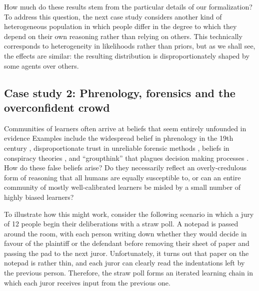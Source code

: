 \documentclass[doc]{apa6}
\begin{document}
How much do these results stem from the particular details of our formalization? To address this question, the next case study considers another kind of heterogeneous population in which people differ in the degree to which they depend on their own reasoning rather than relying on others. This technically corresponds to heterogeneity in likelihoods rather than priors, but as we shall see, the effects are similar: the resulting distribution is disproportionately shaped by some agents over others.

\subsection{Case study 2: Phrenology, forensics and the overconfident crowd}

Communities of learners often arrive at beliefs that seem entirely unfounded in evidence Examples include the widespread belief in phrenology in the 19th century \parencite{faigman2007anecdotal}, disproportionate trust in unreliable forensic methods \parencite{pcast2016}, beliefs in conspiracy theories \parencite{goertzel1994belief}, and ``groupthink'' that plagues decision making processes \parencite{janis1982groupthink}. How do these false beliefs arise? Do they necessarily reflect an overly-credulous form of reasoning that all humans are equally susceptible to, or can an entire community of mostly well-calibrated learners be misled by a small number of highly biased learners?

To illustrate how this might work, consider the following scenario in which a jury of 12 people begin their deliberations with a straw poll. A notepad is passed around the room, with each person writing down whether they would decide in favour of the plaintiff or the defendant before removing their sheet of paper and passing the pad to the next juror. Unfortunately, it turns out that paper on the notepad is rather thin, and each juror can clearly read the indentations left by the previous person. Therefore, the straw poll forms an iterated learning chain in which each juror receives input from the previous one.
\end{document}
